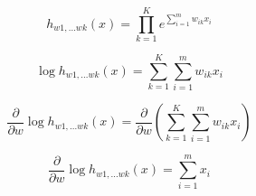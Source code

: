 \documentclass{report}
\begin{document}
  \begin{equation}
    h_{w1,...wk}(x)
    = \prod_{k=1}^{K}e^{\sum_{i=1}^m w_{ik}x_i}
  \end{equation}

  \begin{equation}
    \log h_{w1,...wk}(x)
    = \sum_{k=1}^{K} \sum_{i=1}^m w_{ik}x_i
  \end{equation}

  \begin{equation}
    \frac{\partial}{\partial w} \log h_{w1,...wk}(x)
    = \frac{\partial}{\partial w} \left(\sum_{k=1}^{K} \sum_{i=1}^m w_{ik}x_i\right)
  \end{equation}

  \begin{equation}
    \frac{\partial}{\partial w} \log h_{w1,...wk}(x)
    =  \sum_{i=1}^m x_i
  \end{equation}
\end{document}
